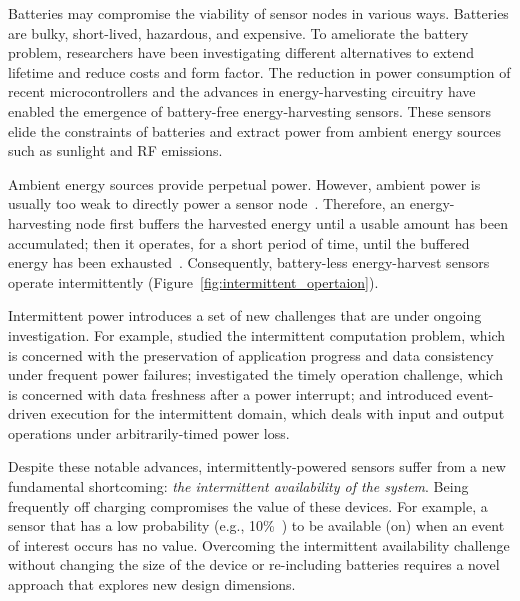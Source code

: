Batteries may compromise the viability of sensor nodes in various ways. Batteries are bulky, short-lived, hazardous, and expensive. To ameliorate the battery problem, researchers have been investigating different alternatives to extend lifetime and reduce costs and form factor.  
The reduction in power consumption of recent microcontrollers and the advances in energy-harvesting circuitry have enabled the emergence of battery-free energy-harvesting sensors. 
These sensors elide the constraints of batteries and extract power from ambient energy sources such as sunlight and RF emissions. 

Ambient energy sources provide perpetual power. However, ambient power is usually too weak to directly power a sensor node~\cite{liu2013ambient}.  Therefore, an energy-harvesting  node first buffers the harvested energy until a usable amount has been accumulated; then it operates, for a short period of time, until the buffered energy has been exhausted~\cite{lucia2017intermittent}.  Consequently, battery-less energy-harvest sensors operate intermittently (Figure~\ref{fig:intermittent_opertaion}).

Intermittent power introduces a set of new challenges that are under ongoing investigation.
For example, \cite{lucia2017intermittent,mementos,dino,colin2016chain,balsamo2015hibernus} studied the intermittent computation problem, which is concerned with the preservation of application progress and data consistency under frequent power failures; \citet{hester2017timely} investigated the timely operation challenge, which is concerned with data freshness after a power interrupt; 
and \citet{yildirim2018ink} introduced event-driven execution for the intermittent domain, which deals with input and output operations under arbitrarily-timed power loss.

Despite these notable advances, intermittently-powered sensors suffer from a new fundamental shortcoming: \textit{the intermittent availability of the system}. Being frequently off charging compromises the value of these devices. For example, a sensor that has a low probability (e.g., 10\%~\cite{coala}) to be available (on) when an event of interest occurs has no value. 
Overcoming the intermittent availability challenge without changing the size of the device or re-including batteries requires a novel approach that explores new design dimensions. 


